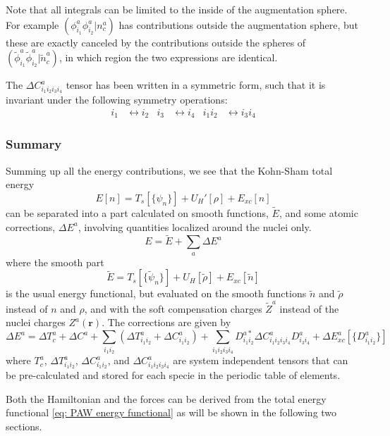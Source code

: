 \documentclass[a4paper]{article}
\newcommand{\s}[1]{\tilde{#1}}
\newcommand{\br}{\mathbf{r}}
\begin{document}
%
Note that all integrals can be limited to the inside of the
augmentation sphere. For example $(\phi_{i_1}^a\phi_{i_2}^{a}|n_c^a)$
has contributions outside the augmentation sphere, but these are
exactly canceled by the contributions outside the spheres of
$(\s{\phi}_{i_1}^a\s{\phi}_{i_2}^{a}|\s{n}_c^a)$, in which region the
two expressions are identical.
\par The $\Delta C^a_{i_1i_2i_3i_4}$ tensor has been written in a symmetric
form, such that it is invariant under the following symmetry
operations:
%
\begin{align}\label{eq: C symmetry}
  i_1 &\leftrightarrow i_2 &   i_3 &\leftrightarrow i_4 &   i_1i_2 &\leftrightarrow i_3i_4
\end{align}
%
%
%

\subsubsection{Summary}
Summing up all the energy contributions, we see that the Kohn-Sham total energy
%
\begin{equation*}
  E[n] = T_s[\{\psi_n\}] + U_H'[\rho] + E_{xc}[n]
\end{equation*}
%
can be separated into a part calculated on smooth functions, $\s{E}$,
and some atomic corrections, $\Delta E^a$, involving quantities
localized around the nuclei only.
%
\begin{equation}\label{eq: PAW energy functional}
E = \s{E} + \sum_a \Delta E^a
\end{equation}
%
where the smooth part
%
\begin{equation}
  \s{E} = T_s[\{\s{\psi}_n\}] + U_H[\s{\rho}] + E_{xc}[\s{n}]
\end{equation}
%
is the usual energy functional, but evaluated on the smooth functions
$\s{n}$ and $\s{\rho}$ instead of $n$ and $\rho$, and with the soft
compensation charges $\s{Z}^a$ instead of the nuclei charges
$Z^a(\br)$. The corrections are given by
%
\begin{equation}
  \Delta E^a = \Delta T_c^a + \Delta C^a + \sum_{i_1i_2} \left(\Delta T^a_{i_1i_2} + \Delta C^a_{i_1i_2}\right) + \sum_{i_1i_2i_3i_4} D^{a*}_{i_1i_2} \Delta C^a_{i_1i_2i_3i_4} D^a_{i_3i_4} + \Delta E_{xc}^a[\{D^a_{i_1i_2}\}]
\end{equation}
%
where $T^a_c$, $\Delta T_{i_1i_2}^a$, $\Delta C_{i_1i_2}^a$, and
$\Delta C_{i_1i_2i_3i_4}^a$ are system independent tensors that can be
pre-calculated and stored for each specie in the periodic table of
elements.
\par Both the Hamiltonian and the forces can be derived from the total
energy functional \ref{eq: PAW energy functional} as will be shown
in the following two sections.
\end{document}
